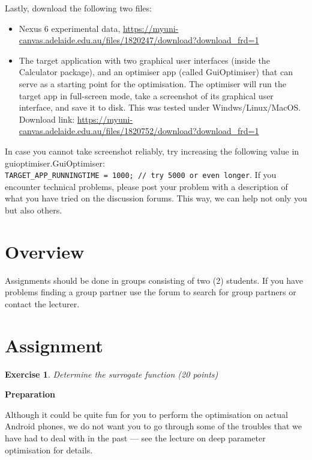 \documentclass{pracs}
\newtheorem{exercise}{Exercise}
\begin{document}
Lastly, download the following two files:

\begin{itemize}
\item Nexus 6 experimental data, \url{https://myuni-canvas.adelaide.edu.au/files/1820247/download?download_frd=1}
\item The target application with two graphical user interfaces (inside the Calculator package), and  an optimiser app (called GuiOptimiser) that can serve as a starting point for the optimisation. The optimiser will run the target app in full-screen mode, take a screenshot of its graphical user interface, and save it to disk. This was tested under Windws/Linux/MacOS. Download link: \url{https://myuni-canvas.adelaide.edu.au/files/1820752/download?download_frd=1}
\end{itemize}

In case you cannot take screenshot reliably, try increasing the following value in guioptimiser.GuiOptimiser: \\\texttt{TARGET\_APP\_RUNNINGTIME = 1000; // try 5000 or even longer}.
If you encounter technical problems, please post your problem with a description of what you have tried on the discussion forums. This way, we can help not only you but also others.







\section{Overview}
Assignments should be done in groups consisting of two (2) students.  If you have problems finding a group partner use the forum to search for group partners or contact the lecturer.

\section{Assignment}

\begin{exercise}
Determine the surrogate function (20 points)
\end{exercise}

\textbf{Preparation}

Although it could be quite fun for you to perform the optimisation on actual Android phones, we do not want you to go through some of the troubles that we have had to deal with in the past --- see the lecture on deep parameter optimisation for details.
\end{document}
